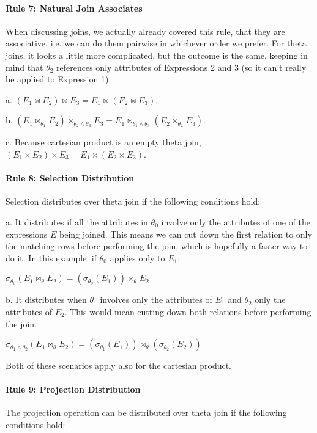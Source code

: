 \documentclass[a4paper]{report}
\begin{document}
\paragraph{Rule 7: Natural Join Associates}
When discussing joins, we actually already covered this rule, that they are associative, i.e. we can do them pairwise in whichever order we prefer. For theta joins, it looks a little more complicated, but the outcome is the same, keeping in mind that $\theta_{2}$ references only attributes of Expressions 2 and 3 (so it can't really be applied to Expression 1).


a. $(E_{1} \bowtie E_{2}) \bowtie E_{3} = E_{1} \bowtie (E_{2} \bowtie E_{3})$. 

b. $(E_{1} \bowtie_{\theta_{1}} E_{2}) \bowtie_{\theta_{2}\wedge\theta_{3}} E_{3} = E_{1} \bowtie_{\theta_{1}\wedge\theta_{3}} (E_{2} \bowtie_{\theta_{2}} E_{3})$. 

c. Because cartesian product is an empty theta join, $(E_{1} \times E_{2}) \times E_{3} = E_{1} \times (E_{2} \times E_{3})$. 


\paragraph{Rule 8: Selection Distribution}
Selection distributes over theta join if the following conditions hold:

a. It distributes if all the attributes in $\theta_{0}$ involve only the attributes of one of the expressions $E$ being joined. This means we can cut down the first relation to only the matching rows before performing the join, which is hopefully a faster way to do it. In this example, if $\theta_{0}$ applies only to $E_{1}$:

$\sigma_{\theta_{0}}(E_{1} \bowtie_{\theta} E_{2}) = (\sigma_{\theta_{0}}(E_{1})) \bowtie_{\theta} E_{2}$ 

b. It distributes when $\theta_{1}$ involves only the attributes of $E_{1}$ and $\theta_{2}$ only the attributes of $E_{2}$. This would mean cutting down both relations before performing the join.

$\sigma_{\theta_{1}\wedge\theta_{2}} (E_{1} \bowtie_{\theta} E_{2}) = (\sigma_{\theta_{1}}(E_{1})) \bowtie_{\theta} (\sigma_{\theta_{2}}(E_{2})) $

Both of these scenarios apply also for the cartesian product.

\paragraph{Rule 9: Projection Distribution}
The projection operation can be distributed over theta join if the following conditions hold:
\end{document}
